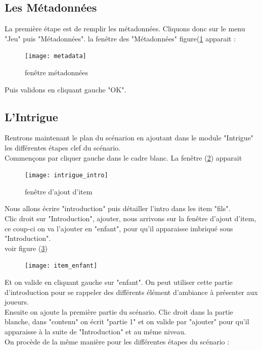 \documentclass[a4paper,12pt]{article}
\begin{document}
\subsection{Les Métadonnées}
La première étape est de remplir les métadonnées. Cliquons donc sur le menu "Jeu" puis "Métadonnées".
la fenêtre des "Métadonnées" figure(\ref{metadata} apparait :
\begin{figure}[h!]
    \texttt{[image: metadata]}
    \caption{fenêtre métadonnées}
    \label{metadata}
\end{figure}
Puis validons en cliquant gauche "OK".

\subsection{L'Intrigue}
Rentrons maintenant le plan du scénarion en ajoutant dans le module "Intrigue" les différentes étapes clef du scénario.
\\
Commençons par cliquer gauche dans le cadre blanc. La fenêtre (\ref{intrigue_scenario}) apparait 
\begin{figure}[h!]
    \texttt{[image: intrigue\_intro]}
    \caption{fenêtre d'ajout d'item}
    \label{intrigue_scenario}
\end{figure}
Nous allons écrire "introduction" puis détailler l'intro dans les item "fils".
\\
Clic droit sur "Introduction", ajouter, nous arrivons sur la fenêtre d'ajout d'item, ce coup-ci on va l'ajouter en "enfant", pour qu'il apparaisse imbriqué sous "Introduction".
\\
voir figure (\ref{item_enfant})
\begin{figure}[h!]
    \texttt{[image: item\_enfant]}
    \label{item_enfant}
\end{figure}
Et on valide en cliquant gauche sur "enfant".
On peut utiliser cette partie d'introduction pour se rappeler des différents élément d'ambiance à présenter aux joueurs.
\\
Ensuite on ajoute la première partie du scénario. Clic droit dans la partie blanche, dans "contenu" on écrit "partie 1" et on valide par "ajouter" pour qu'il apparaisse à la suite de "Introduction" et au même niveau.
\\
On procède de la même manière pour les différentes étapes du scénario :
\end{document}
